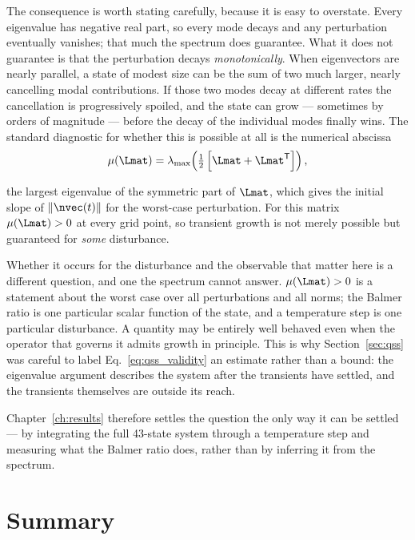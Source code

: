 The consequence is worth stating carefully, because it is easy to overstate.
Every eigenvalue has negative real part, so every mode decays and any
perturbation eventually vanishes; that much the spectrum does guarantee.
What it does not guarantee is that the perturbation decays \emph{monotonically}.
When eigenvectors are nearly parallel, a state of modest size can be the sum of
two much larger, nearly cancelling modal contributions. If those two modes decay
at different rates the cancellation is progressively spoiled, and the state can
grow --- sometimes by orders of magnitude --- before the decay of the individual
modes finally wins. The standard diagnostic for whether this is possible at all
is the numerical abscissa
\begin{equation}
  \mu(\Lmat) = \lambda_{\max}\!\left(\tfrac{1}{2}\left[\Lmat + \Lmat^{\mathsf T}\right]\right),
  \label{eq:numerical_abscissa}
\end{equation}

\noindent the largest eigenvalue of the symmetric part of $\Lmat$, which gives
the initial slope of $\|\nvec(t)\|$ for the worst-case perturbation. For this
matrix $\mu(\Lmat) > 0$ at every grid point, so transient growth is not merely
possible but guaranteed for \emph{some} disturbance.

Whether it occurs for the disturbance and the observable that matter here is a
different question, and one the spectrum cannot answer. $\mu(\Lmat) > 0$ is a
statement about the worst case over all perturbations and all norms; the Balmer
ratio is one particular scalar function of the state, and a temperature step is
one particular disturbance. A quantity may be entirely well behaved even when
the operator that governs it admits growth in principle. This is why
Section~\ref{sec:qss} was careful to label Eq.~\eqref{eq:qss_validity} an
estimate rather than a bound: the eigenvalue argument describes the system after
the transients have settled, and the transients themselves are outside its
reach.

Chapter~\ref{ch:results} therefore settles the question the only way it can be
settled --- by integrating the full 43-state system through a temperature step
and measuring what the Balmer ratio does, rather than by inferring it from the
spectrum.

\section{Summary}
\label{sec:theory_summary}


